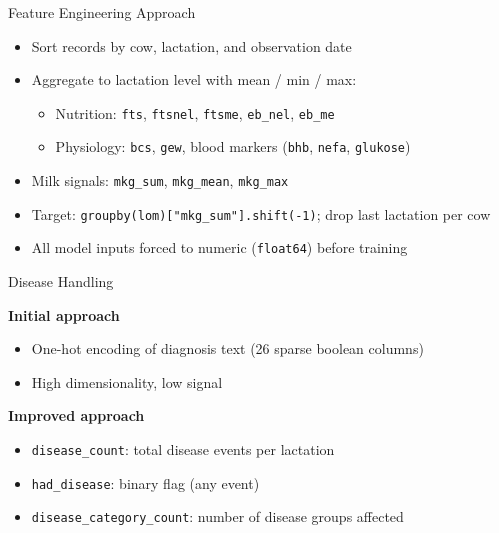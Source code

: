 \documentclass{beamer}
\begin{document}
\begin{frame}{Feature Engineering Approach}

\begin{itemize}
    \item Sort records by cow, lactation, and observation date
    \item Aggregate to lactation level with mean / min / max:
    \begin{itemize}
        \item Nutrition: \texttt{fts}, \texttt{ftsnel}, \texttt{ftsme}, \texttt{eb\_nel}, \texttt{eb\_me}
        \item Physiology: \texttt{bcs}, \texttt{gew}, blood markers (\texttt{bhb}, \texttt{nefa}, \texttt{glukose})
    \end{itemize}
    \item Milk signals: \texttt{mkg\_sum}, \texttt{mkg\_mean}, \texttt{mkg\_max}
    \item Target: \texttt{groupby(lom)["mkg\_sum"].shift(-1)}; drop last lactation per cow
    \item All model inputs forced to numeric (\texttt{float64}) before training
\end{itemize}

\end{frame}

\begin{frame}{Disease Handling}

\textbf{Initial approach}
\begin{itemize}
    \item One-hot encoding of diagnosis text (26 sparse boolean columns)
    \item High dimensionality, low signal
\end{itemize}

\vspace{0.3cm}

\textbf{Improved approach}
\begin{itemize}
    \item \texttt{disease\_count}: total disease events per lactation
    \item \texttt{had\_disease}: binary flag (any event)
    \item \texttt{disease\_category\_count}: number of disease groups affected
\end{itemize}

\end{frame}
\end{document}
